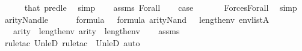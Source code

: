 \begin{isabellebody}
\ \ \ \ \isamarkupfalse%
\ that\ pred{\isacharunderscore}{\kern0pt}le{}\ \isamarkupfalse%
\ {\isacharparenleft}{\kern0pt}simp{\isacharparenright}{\kern0pt}\isanewline
\ \ \isamarkupfalse%
\ assms\ Forall\isanewline
\ \ \isamarkupfalse%
\ {\isacharquery}{\kern0pt}case\ \isanewline
\ \ \ \ \isamarkupfalse%
\ Forces{\isacharunderscore}{\kern0pt}Forall\ \isamarkupfalse%
\ simp\isanewline
{}\isamarkupfalse%
%
\endisatagproof
{\isafoldproof}%
%
\isadelimproof
%
\endisadelimproof
%
\isadelimdocument
%
\endisadelimdocument
%
\isatagdocument
%
\isamarkuptrue%
%
\endisatagdocument
{\isafolddocument}%
%
\isadelimdocument
%
\endisadelimdocument
{}\isamarkupfalse%
\ arity{\isacharunderscore}{\kern0pt}Nand{\isacharunderscore}{\kern0pt}le{\isacharcolon}{\kern0pt}\ \isanewline
\ \ \ {\isachardoublequoteopen}{\isasymphi}\ {\isasymin}\ formula{\isachardoublequoteclose}\ {\isachardoublequoteopen}{\isasympsi}\ {\isasymin}\ formula{\isachardoublequoteclose}\ {\isachardoublequoteopen}arity{\isacharparenleft}{\kern0pt}Nand{\isacharparenleft}{\kern0pt}{\isasymphi}{\isacharcomma}{\kern0pt}\ {\isasympsi}{\isacharparenright}{\kern0pt}{\isacharparenright}{\kern0pt}\ {\isasymle}\ length{\isacharparenleft}{\kern0pt}env{\isacharparenright}{\kern0pt}{\isachardoublequoteclose}\ {\isachardoublequoteopen}env{\isasymin}list{\isacharparenleft}{\kern0pt}A{\isacharparenright}{\kern0pt}{\isachardoublequoteclose}\isanewline
\ \ \ {\isachardoublequoteopen}arity{\isacharparenleft}{\kern0pt}{\isasymphi}{\isacharparenright}{\kern0pt}\ {\isasymle}\ length{\isacharparenleft}{\kern0pt}env{\isacharparenright}{\kern0pt}{\isachardoublequoteclose}\ {\isachardoublequoteopen}arity{\isacharparenleft}{\kern0pt}{\isasympsi}{\isacharparenright}{\kern0pt}\ {\isasymle}\ length{\isacharparenleft}{\kern0pt}env{\isacharparenright}{\kern0pt}{\isachardoublequoteclose}\isanewline
%
\isadelimproof
\ \ %
\endisadelimproof
%
\isatagproof
{}\isamarkupfalse%
\ assms\ \isanewline
\ \ \isamarkupfalse%
\ {\isacharparenleft}{\kern0pt}rule{\isacharunderscore}{\kern0pt}tac\ Un{\isacharunderscore}{\kern0pt}leD{}{\isacharcomma}{\kern0pt}\ rule{\isacharunderscore}{\kern0pt}tac\ {\isacharbrackleft}{\kern0pt}{}{\isacharbrackright}{\kern0pt}\ Un{\isacharunderscore}{\kern0pt}leD{}{\isacharcomma}{\kern0pt}\ auto{\isacharparenright}{\kern0pt}%
\endisatagproof

\end{isabellebody}
